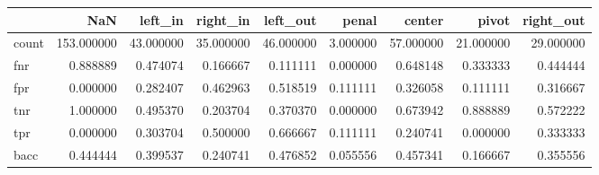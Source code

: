 \begin{tabular}{lrrrrrrrr}
\toprule
{} &         NaN &    left\_in &   right\_in &   left\_out &     penal &     center &      pivot &  right\_out \\
\midrule
count &  153.000000 &  43.000000 &  35.000000 &  46.000000 &  3.000000 &  57.000000 &  21.000000 &  29.000000 \\
fnr   &    0.888889 &   0.474074 &   0.166667 &   0.111111 &  0.000000 &   0.648148 &   0.333333 &   0.444444 \\
fpr   &    0.000000 &   0.282407 &   0.462963 &   0.518519 &  0.111111 &   0.326058 &   0.111111 &   0.316667 \\
tnr   &    1.000000 &   0.495370 &   0.203704 &   0.370370 &  0.000000 &   0.673942 &   0.888889 &   0.572222 \\
tpr   &    0.000000 &   0.303704 &   0.500000 &   0.666667 &  0.111111 &   0.240741 &   0.000000 &   0.333333 \\
bacc  &    0.444444 &   0.399537 &   0.240741 &   0.476852 &  0.055556 &   0.457341 &   0.166667 &   0.355556 \\
\bottomrule
\end{tabular}
